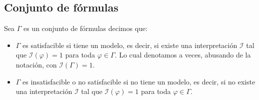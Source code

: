 \documentclass[a4paper]{article}
\begin{document}
\subsection{Conjunto de fórmulas}
Sea $\Gamma$ es un conjunto de fórmulas decimos que:
\begin{itemize}
    \item $\Gamma$ es satisfacible si tiene un modelo, es decir, si existe una 
    interpretación $\mathcal{I}$ tal que $\mathcal{I}(\varphi)=1$ para toda 
    $\varphi\in\Gamma$. Lo cual denotamos a veces, abusando de la notación, 
    con $\mathcal{I}(\Gamma)=1$.
    \item $\Gamma$ es insatisfacible o no satisfacible si no tiene un
    modelo, es decir, si no existe una interpretación $\mathcal{I}$ tal que 
    $\mathcal{I}(\varphi)=1$ para toda $\varphi\in\Gamma$.
\end{itemize}
\end{document}
